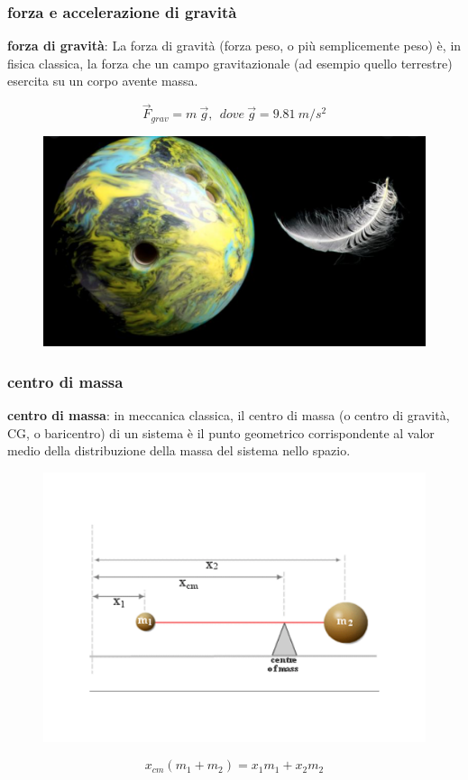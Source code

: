 \documentclass{beamer}
\begin{document}
\begin{frame}
\frametitle{forza e accelerazione di gravità}
\textbf{forza di gravità}: La forza di gravità (forza peso, o più semplicemente peso) è, in fisica classica, la forza che un campo gravitazionale (ad esempio quello terrestre) esercita su un corpo avente massa.
\pause

$$\vec{F}_{grav} = m \  \vec{g}, \ \ dove \  \vec{g} = 9.81 \ m/s^2$$ 
\pause

\begin{figure}
\includegraphics[scale=0.25]{./images/feather}
\end{figure}

\end{frame}

\begin{frame}
\frametitle{centro di massa}
\textbf{centro di massa}: in meccanica classica, il centro di massa (o centro di gravità, CG, o baricentro) di un sistema è il punto geometrico corrispondente al valor medio della distribuzione della massa del sistema nello spazio.
\pause

\begin{figure}
\includegraphics[scale=0.2]{./images/cdm}
\end{figure}
\pause

$$x_{cm} (m_1 + m_2) = x_1 m_1 + x_2  m_2$$ \\

\end{frame}
\end{document}
